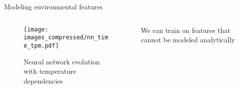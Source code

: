 \documentclass[aspectratio=169]{beamer}
\begin{document}
\begin{frame}{\small{Modeling environmental features}}
    \begin{columns}[c]
        \begin{column}{0.55\textwidth}
            \begin{figure}
                \centering
                \texttt{[image: images\_compressed/nn\_time\_tpm.pdf]}
                \caption{\tiny Neural network evolution with temperature
                dependencies}
            \end{figure}
        \end{column}
        \begin{column}{0.45\textwidth}
            \begin{tcolorbox}[colback=blue!5!white,colframe=blue!75!black,title=]
                We can train on features that cannot be modeled analytically
            \end{tcolorbox}
        \end{column}
    \end{columns}
\end{frame}


\end{document}
